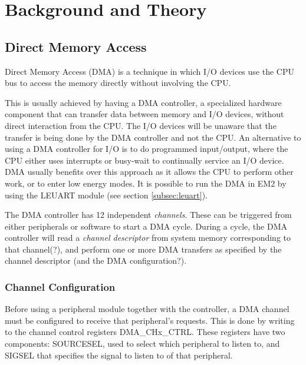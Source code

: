 \chapter{Background and Theory}


\section{Direct Memory Access}
Direct Memory Access (DMA) is a technique in which I/O devices use the CPU bus to access the memory directly without involving the CPU. 


This is usually achieved by having a DMA controller, a specialized hardware component that can transfer data between memory and I/O devices, without direct interaction from the CPU. The I/O devices will be unaware that the transfer is being done by the DMA controller and not the CPU. An alternative to using a DMA controller for I/O is to do programmed input/output, where the CPU either uses interrupts or busy-wait to continually service an I/O device. DMA usually benefits over this approach as it allows the CPU to perform other work, or to enter low energy modes. It is possible to run the DMA in EM2 by using the LEUART module (see section \ref{subsec:leuart}).


The DMA controller has 12 independent \emph{channels}. These can be triggered from either peripherals or software to start a DMA cycle. During a cycle, the DMA controller will read a \emph{channel descriptor} from system memory corresponding to that channel(?), and perform one or more DMA transfers as specified by the channel descriptor (and the DMA configuration?).

\subsection{Channel Configuration}
Before using a peripheral module together with the controller, a DMA channel must be configured to receive that peripheral's requests. This is done by writing to the channel control registers DMA\_CHx\_CTRL. These registers have two components: SOURCESEL, used to select which peripheral to listen to, and SIGSEL that specifies the signal to listen to of that peripheral.

